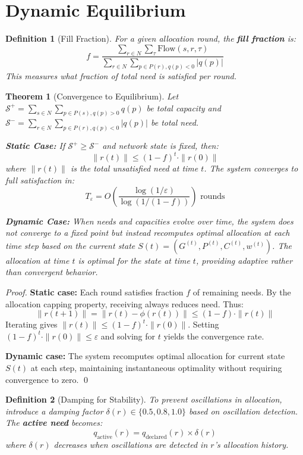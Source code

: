 \documentclass[11pt]{article}
\newtheorem{definition}{Definition}
\newtheorem{theorem}{Theorem}
\begin{document}
\section{Dynamic Equilibrium}

\begin{definition}[Fill Fraction]
For a given allocation round, the \textbf{fill fraction} is:
\[
f = \frac{\sum_{r \in N} \sum_{\tau} \text{Flow}(s, r, \tau)}{\sum_{r \in N} \sum_{p \in P(r), q(p) < 0} |q(p)|}
\]
This measures what fraction of total need is satisfied per round.
\end{definition}

\begin{theorem}[Convergence to Equilibrium]
Let $\mathcal{S}^+ = \sum_{s \in N} \sum_{p \in P(s), q(p) > 0} q(p)$ be total capacity and $\mathcal{S}^- = \sum_{r \in N} \sum_{p \in P(r), q(p) < 0} |q(p)|$ be total need.

\textbf{Static Case:} If $\mathcal{S}^+ \geq \mathcal{S}^-$ and network state is fixed, then:
\[
\|r(t)\| \leq (1-f)^t \cdot \|r(0)\|
\]
where $\|r(t)\|$ is the total unsatisfied need at time $t$. The system converges to full satisfaction in:
\[
T_\varepsilon = O\left(\frac{\log(1/\varepsilon)}{\log(1/(1-f))}\right) \text{ rounds}
\]

\textbf{Dynamic Case:} When needs and capacities evolve over time, the system does not converge to a fixed point but instead recomputes optimal allocation at each time step based on the current state $S(t) = (G^{(t)}, P^{(t)}, C^{(t)}, w^{(t)})$. The allocation at time $t$ is optimal for the state at time $t$, providing adaptive rather than convergent behavior.
\end{theorem}

\begin{proof}
\textbf{Static case:} Each round satisfies fraction $f$ of remaining needs. By the allocation capping property, receiving always reduces need. Thus:
\[
\|r(t+1)\| = \|r(t) - \phi(r(t))\| \leq (1-f) \cdot \|r(t)\|
\]
Iterating gives $\|r(t)\| \leq (1-f)^t \cdot \|r(0)\|$. Setting $(1-f)^t \cdot \|r(0)\| \leq \varepsilon$ and solving for $t$ yields the convergence rate.

\textbf{Dynamic case:} The system recomputes optimal allocation for current state $S(t)$ at each step, maintaining instantaneous optimality without requiring convergence to zero. \qed
\end{proof}

\begin{definition}[Damping for Stability]
To prevent oscillations in allocation, introduce a damping factor $\delta(r) \in \{0.5, 0.8, 1.0\}$ based on oscillation detection. The \textbf{active need} becomes:
\[
q_{\text{active}}(r) = q_{\text{declared}}(r) \times \delta(r)
\]
where $\delta(r)$ decreases when oscillations are detected in $r$'s allocation history.
\end{definition}
\end{document}
